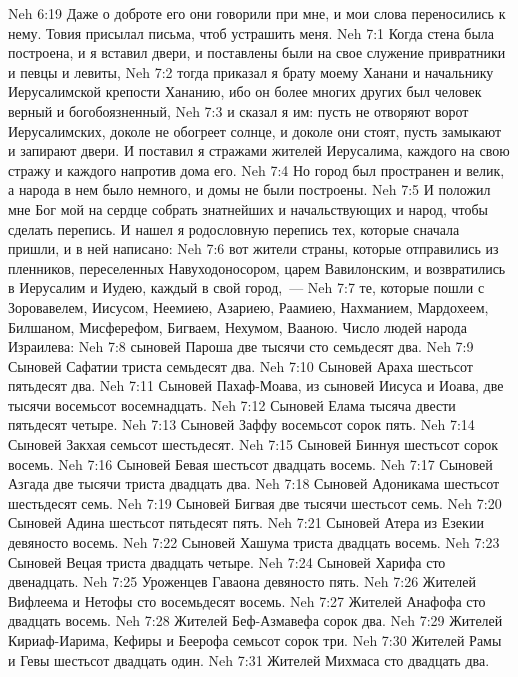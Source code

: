\vs Neh 6:19 Даже о доброте его они говорили при мне, и мои слова переносились к нему. Товия присылал письма, чтоб устрашить меня.
\vs Neh 7:1 Когда стена была построена, и я вставил двери, и поставлены были на свое служение привратники и певцы и левиты,
\vs Neh 7:2 тогда приказал я брату моему Ханани и начальнику Иерусалимской крепости Хананию, ибо он более многих других был человек верный и богобоязненный,
\vs Neh 7:3 и сказал я им: пусть не отворяют ворот Иерусалимских, доколе не обогреет солнце, и доколе они стоят, пусть замыкают и запирают двери. И поставил я стражами жителей Иерусалима, каждого на свою стражу и каждого напротив дома его.
\vs Neh 7:4 Но город был пространен и велик, а народа в нем было немного, и домы не были построены.
\rsbpar\vs Neh 7:5 И положил мне Бог мой на сердце собрать знатнейших и начальствующих и народ, чтобы сделать перепись. И нашел я родословную перепись тех, которые сначала пришли, и в ней написано:
\vs Neh 7:6 вот жители страны, которые отправились из пленников, переселенных Навуходоносором, царем Вавилонским, и возвратились в Иерусалим и Иудею, каждый в свой город,~---
\vs Neh 7:7 те, которые пошли с Зоровавелем, Иисусом, Неемиею, Азариею, Раамиею, Нахманием, Мардохеем, Билшаном, Мисферефом, Бигваем, Нехумом, Вааною. Число людей народа Израилева:
\vs Neh 7:8 сыновей Пароша две тысячи сто семьдесят два.
\vs Neh 7:9 Сыновей Сафатии триста семьдесят два.
\vs Neh 7:10 Сыновей Араха шестьсот пятьдесят два.
\vs Neh 7:11 Сыновей Пахаф-Моава, из сыновей Иисуса и Иоава, две тысячи восемьсот восемнадцать.
\vs Neh 7:12 Сыновей Елама тысяча двести пятьдесят четыре.
\vs Neh 7:13 Сыновей Заффу восемьсот сорок пять.
\vs Neh 7:14 Сыновей Закхая семьсот шестьдесят.
\vs Neh 7:15 Сыновей Биннуя шестьсот сорок восемь.
\vs Neh 7:16 Сыновей Бевая шестьсот двадцать восемь.
\vs Neh 7:17 Сыновей Азгада две тысячи триста двадцать два.
\vs Neh 7:18 Сыновей Адоникама шестьсот шестьдесят семь.
\vs Neh 7:19 Сыновей Бигвая две тысячи шестьсот семь.
\vs Neh 7:20 Сыновей Адина шестьсот пятьдесят пять.
\vs Neh 7:21 Сыновей Атера из  Езекии девяносто восемь.
\vs Neh 7:22 Сыновей Хашума триста двадцать восемь.
\vs Neh 7:23 Сыновей Вецая триста двадцать четыре.
\vs Neh 7:24 Сыновей Харифа сто двенадцать.
\vs Neh 7:25 Уроженцев Гаваона девяносто пять.
\vs Neh 7:26 Жителей Вифлеема и Нетофы сто восемьдесят восемь.
\vs Neh 7:27 Жителей Анафофа сто двадцать восемь.
\vs Neh 7:28 Жителей Беф-Азмавефа сорок два.
\vs Neh 7:29 Жителей Кириаф-Иарима, Кефиры и Беерофа семьсот сорок три.
\vs Neh 7:30 Жителей Рамы и Гевы шестьсот двадцать один.
\vs Neh 7:31 Жителей Михмаса сто двадцать два.
